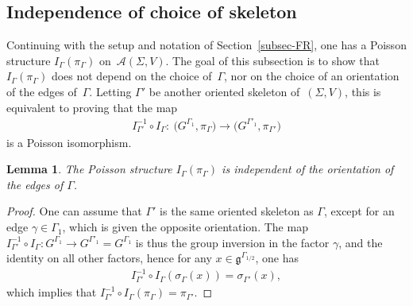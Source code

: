 \documentclass[10pt,a4paper]{amsart}
\numberwithin{equation}{section}
\newtheorem{Lemma}[Theorem]{Lemma}
\def \g {\mathfrak{a}}
\def \g {\mathfrak{g}}
\def \A {{\mathcal{A}}}
\def \sGam {{\scriptscriptstyle \Gamma}}
\begin{document}
\subsection{Independence of choice of skeleton} \label{subsec-indep}

Continuing with the setup and notation of Section~\ref{subsec-FR}, one has a Poisson structure $I_\Gamma(\pi_{\sGam})$ on~$\A(\Sigma,V)$. The goal of this subsection is to show that $I_\Gamma(\pi_{\sGam})$ does not depend on the choice of~$\Gamma$, nor on the choice of an orientation of the edges of~$\Gamma$. Letting $\Gamma'$ be another oriented skeleton of~$(\Sigma,V)$, this is equivalent to proving that the map
\begin{gather}
I_{\Gamma'}^{-1} \circ I_{\Gamma}\colon \ \big (G^{\Gamma_1}, \pi_{\sGam}\big) \longrightarrow \big(G^{\Gamma'_1}, \pi_{\sGam'}\big) \label{IcircI}
\end{gather}
is a Poisson isomorphism.

\begin{Lemma} \label{lem-orient}
The Poisson structure $I_\Gamma(\pi_{\sGam})$ is independent of the orientation of the edges of $\Gamma$.
\end{Lemma}
\begin{proof}
One can assume that $\Gamma'$ is the same oriented skeleton as $\Gamma$, except for an edge $\gamma \in \Gamma_1$, which is given the opposite orientation. The map $I_{\Gamma'}^{-1} \circ I_{\Gamma}\colon G^{\Gamma_1} \to G^{\Gamma'_1} = G^{\Gamma_1}$ is thus the group inversion in the factor $\gamma$, and the identity on all other factors, hence for any $x \in \g^{\sGam_{1/2}}$, one has
\begin{gather*}
I_{\Gamma'}^{-1} \circ I_{\Gamma}(\sigma_{\sGam}(x)) = \sigma_{\sGam'}(x),
\end{gather*}
which implies that $I_{\Gamma'}^{-1} \circ I_{\Gamma}(\pi_{\sGam}) = \pi_{\sGam'}$.
\end{proof}
\end{document}
